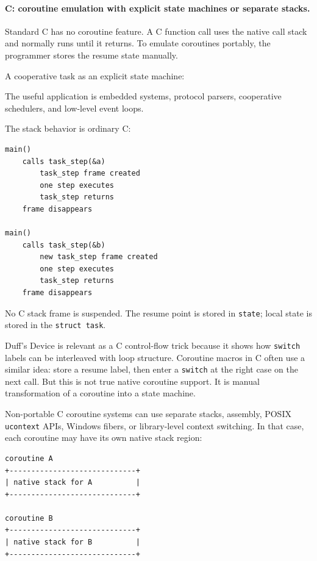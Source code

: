 \paragraph{C: coroutine emulation with explicit state machines or separate stacks.}

Standard C has no coroutine feature. A C function call uses the native call stack and normally runs until it returns. To emulate coroutines portably, the programmer stores the resume state manually.

A cooperative task as an explicit state machine:

The useful application is embedded systems, protocol parsers, cooperative schedulers, and low-level event loops.

The stack behavior is ordinary C:

\begin{verbatim}
main()
    calls task_step(&a)
        task_step frame created
        one step executes
        task_step returns
    frame disappears

main()
    calls task_step(&b)
        new task_step frame created
        one step executes
        task_step returns
    frame disappears
\end{verbatim}

No C stack frame is suspended. The resume point is stored in \texttt{state}; local state is stored in the \texttt{struct task}.

Duff's Device is relevant as a C control-flow trick because it shows how \texttt{switch} labels can be interleaved with loop structure. Coroutine macros in C often use a similar idea: store a resume label, then enter a \texttt{switch} at the right case on the next call. But this is not true native coroutine support. It is manual transformation of a coroutine into a state machine.

Non-portable C coroutine systems can use separate stacks, assembly, POSIX \texttt{ucontext} APIs, Windows fibers, or library-level context switching. In that case, each coroutine may have its own native stack region:

\begin{verbatim}
coroutine A
+-----------------------------+
| native stack for A          |
+-----------------------------+

coroutine B
+-----------------------------+
| native stack for B          |
+-----------------------------+
\end{verbatim}

